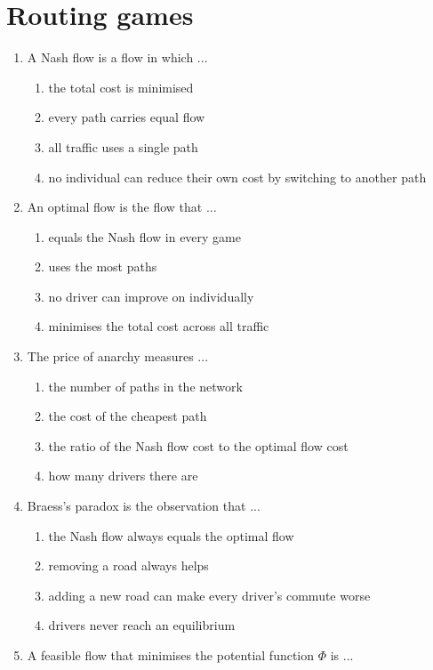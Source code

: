 \documentclass[11pt]{article}
\begin{document}
\section*{Routing games}
\begin{enumerate}[itemsep=6pt]
  \item A Nash flow is a flow in which ...
  \begin{enumerate}
    \item the total cost is minimised
    \item every path carries equal flow
    \item all traffic uses a single path
    \item no individual can reduce their own cost by switching to another path
  \end{enumerate}
  \item An optimal flow is the flow that ...
  \begin{enumerate}
    \item equals the Nash flow in every game
    \item uses the most paths
    \item no driver can improve on individually
    \item minimises the total cost across all traffic
  \end{enumerate}
  \item The price of anarchy measures ...
  \begin{enumerate}
    \item the number of paths in the network
    \item the cost of the cheapest path
    \item the ratio of the Nash flow cost to the optimal flow cost
    \item how many drivers there are
  \end{enumerate}
  \item Braess's paradox is the observation that ...
  \begin{enumerate}
    \item the Nash flow always equals the optimal flow
    \item removing a road always helps
    \item adding a new road can make every driver's commute worse
    \item drivers never reach an equilibrium
  \end{enumerate}
  \item A feasible flow that minimises the potential function \(\Phi\) is ...
  \begin{enumerate}

\end{enumerate}
\end{enumerate}
\end{document}
